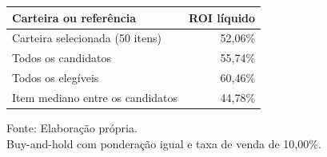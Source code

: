 \begingroup
\setlength{}
\setlength{}
\fontsize{12.0pt}{14.4pt}\selectfont

\setlength{\LTpost}{0mm}
\begin{longtable}{@{\extracolsep{\fill}}lr}

\toprule
\textbf{Carteira ou referência} & \textbf{ROI líquido} \\ 
\midrule\addlinespace[2.5pt]
Carteira selecionada (50 itens) & 52,06\% \\
Todos os candidatos & 55,74\% \\
Todos os elegíveis & 60,46\% \\
Item mediano entre os candidatos & 44,78\% \\
\bottomrule
\end{longtable}
\begin{minipage}{\linewidth}
Fonte: Elaboração própria.\\
Buy-and-hold com ponderação igual e taxa de venda de 10,00\%.\\
\end{minipage}
\endgroup
